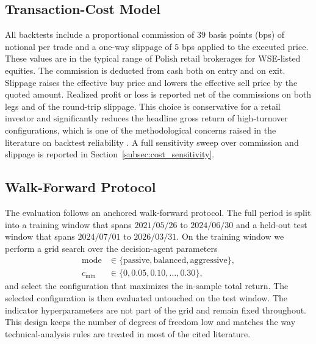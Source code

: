 \documentclass{ieeeaccess}
\begin{document}
\subsection{Transaction-Cost Model}
\label{subsec:costs}

All backtests include a proportional commission of $39$ basis points (bps) of notional per trade and a one-way slippage of $5$ bps applied to the executed price. These values are in the typical range of Polish retail brokerages for WSE-listed equities. The commission is deducted from cash both on entry and on exit. Slippage raises the effective buy price and lowers the effective sell price by the quoted amount. Realized profit or loss is reported net of the commissions on both legs and of the round-trip slippage. This choice is conservative for a retail investor and significantly reduces the headline gross return of high-turnover configurations, which is one of the methodological concerns raised in the literature on backtest reliability \cite{bailey2014}. A full sensitivity sweep over commission and slippage is reported in Section~\ref{subsec:cost_sensitivity}.

\subsection{Walk-Forward Protocol}
\label{subsec:walkforward}

The evaluation follows an anchored walk-forward protocol. The full period is split into a training window that spans $2021/05/26$ to $2024/06/30$ and a held-out test window that spans $2024/07/01$ to $2026/03/31$. On the training window we perform a grid search over the decision-agent parameters
\begin{equation}
\begin{aligned}
\mathrm{mode} &\in \{\text{passive}, \text{balanced}, \text{aggressive}\}, \\
c_{\min} &\in \{0, 0.05, 0.10, \ldots, 0.30\},
\end{aligned}
\end{equation}
and select the configuration that maximizes the in-sample total return. The selected configuration is then evaluated untouched on the test window. The indicator hyperparameters are not part of the grid and remain fixed throughout. This design keeps the number of degrees of freedom low and matches the way technical-analysis rules are treated in most of the cited literature.
\end{document}
